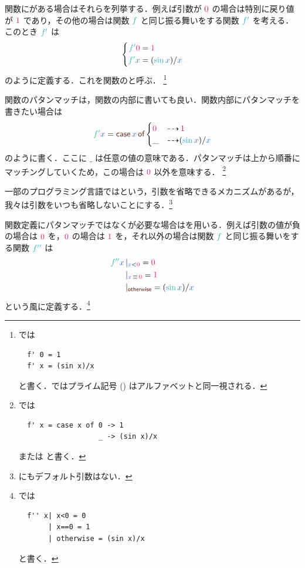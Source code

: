 \documentclass[a5paper,twoside,fleqn,draft]{jsbook}
\begin{document}
関数にがある場合はそれらを列挙する．例えば引数が $\hConstant{0}$ の場合は特別に戻り値が $\hConstant{1}$ であり，その他の場合は関数 $\hFunc{f}$ と同じ振る舞いをする関数 $\hFunc{f'}$ を考える．このとき $\hFunc{f'}$ は
\begin{equation}
  \left\{
  \begin{aligned}
    \hFunc{f'}\hConstant{0}&=\hConstant{1}\\
    \hFunc{f'}\hVar{x}&=(\hSin\hVar{x})/\hVar{x}
  \end{aligned}
  \right.
\end{equation}
のように定義する．これを関数のと呼ぶ．
\footnote{\haskell では
\begin{verbatim}
  f' 0 = 1
  f' x = (sin x)/x
\end{verbatim}
と書く．\haskell ではプライム記号 () はアルファベットと同一視される．}

関数のパタンマッチは，関数の内部に書いても良い．関数内部にパタンマッチを書きたい場合は
\begin{equation}
  \hFunc{f'}\hVar{x}=\hCaseSyntax{\hVar{x}}
  \begin{cases}
    \hConstant{0}&\hIfSo\hConstant{1}\\
    \_&\hIfSo(\hSin\hVar{x})/\hVar{x}
  \end{cases}
\end{equation}
のように書く．ここに $\_$ は任意の値の意味である．パタンマッチは上から順番にマッチングしていくため，この場合は $\hConstant{0}$ 以外を意味する．
\footnote{\haskell では
\begin{verbatim}
  f' x = case x of 0 -> 1
                   _ -> (sin x)/x
\end{verbatim}
または  と書く．}

一部のプログラミング言語ではという，引数を省略できるメカニズムがあるが，我々は引数をいつも省略しないことにする．\footnote{\haskell にもデフォルト引数はない．}

\separator

関数定義にパタンマッチではなくが必要な場合はを用いる．例えば引数の値が負の場合は $\hConstant{0}$ を，$\hConstant{0}$ の場合は $\hConstant{1}$ を，それ以外の場合は関数 $\hFunc{f}$ と同じ振る舞いをする関数 $\hFunc{f''}$ は
\begin{equation}
  \begin{aligned}
    \hFunc{f''}\hVar{x}&\hGuard{\hVar{x}<\hConstant{0}}=\hConstant{0}\\
    &\hGuard{\hVar{x}\hIfEq\hConstant{0}}=\hConstant{1}\\
    &\hGuard{\hOtherwise}=(\hSin\hVar{x})/\hVar{x}
  \end{aligned}
\end{equation}
という風に定義する．\footnote{\haskell では
\begin{verbatim}
  f'' x| x<0 = 0
       | x==0 = 1
       | otherwise = (sin x)/x
\end{verbatim}
と書く．}
\end{document}
